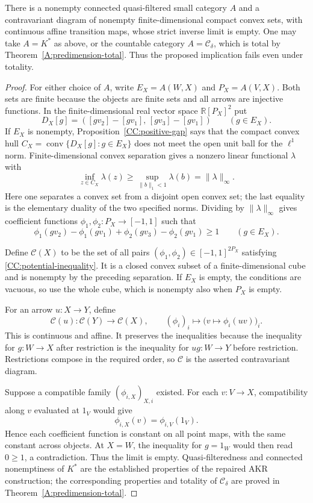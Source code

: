 \begin{theorem}
\label{CC:convex-counterexample}
There is a nonempty connected quasi-filtered small category $A$ and
a contravariant diagram of nonempty finite-dimensional compact convex
sets, with continuous affine transition maps, whose strict inverse
limit is empty. One may take $A=K^*$ as above, or the countable
category $A=\mathcal C_\delta$, which is total by
Theorem~\ref{A:predimension-total}. Thus the proposed implication
fails even under totality.
\end{theorem}
\begin{proof}
For either choice of $A$, write $E_X=A(W,X)$ and $P_X=A(V,X)$.
Both sets are finite because the objects are finite sets and all
arrows are injective functions. In the finite-dimensional real vector
space $\mathbb R[P_X]^2$ put
\[
 D_X[g]=([gv_2]-[gv_1],\,[gv_3]-[gv_1])
 \qquad(g\in E_X).
\]
If $E_X$ is nonempty, Proposition~\ref{CC:positive-gap} says that the
compact convex hull $C_X=\operatorname{conv}\{D_X[g]:g\in E_X\}$
does not meet the open unit ball for the $\ell^1$ norm.
Finite-dimensional convex separation gives a nonzero linear functional
$\lambda$ with
\[
 \inf_{z\in C_X}\lambda(z)
 \geq\sup_{\|b\|_1<1}\lambda(b)=\|\lambda\|_\infty.
\]
Here one separates a convex set from a disjoint open convex set; the
last equality is the elementary duality of the two specified norms.
Dividing by $\|\lambda\|_\infty$ gives coefficient functions
$\phi_1,\phi_2:P_X\to[-1,1]$ such that
\begin{equation}\label{CC:potential-inequality}
 \phi_1(gv_2)-\phi_1(gv_1)
 +\phi_2(gv_3)-\phi_2(gv_1)\geq1
 \qquad(g\in E_X).
\end{equation}

Define $\mathcal C(X)$ to be the set of all pairs
$(\phi_1,\phi_2)\in[-1,1]^{2P_X}$ satisfying
\eqref{CC:potential-inequality}. It is a closed convex subset of a
finite-dimensional cube and is nonempty by the preceding separation.
If $E_X$ is empty, the conditions are vacuous, so use the whole cube,
which is nonempty also when $P_X$ is empty.

For an arrow $u:X\to Y$, define
\[
 \mathcal C(u):\mathcal C(Y)\longrightarrow\mathcal C(X),
 \qquad(\phi_i)_i\longmapsto
 \bigl(v\longmapsto\phi_i(uv)\bigr)_i.
\]
This is continuous and affine. It preserves the inequalities because
the inequality for $g:W\to X$ after restriction is the inequality
for $ug:W\to Y$ before restriction. Restrictions compose in the
required order, so $\mathcal C$ is the asserted contravariant diagram.

Suppose a compatible family $(\phi_{i,X})_{X,i}$ existed. For each
$v:V\to X$, compatibility along $v$ evaluated at $1_V$ would give
\[
 \phi_{i,X}(v)=\phi_{i,V}(1_V).
\]
Hence each coefficient function is constant on all point maps, with
the same constant across objects. At $X=W$, the inequality for
$g=1_W$ would then read $0\geq1$, a contradiction. Thus the limit
is empty. Quasi-filteredness and connected nonemptiness of $K^*$ are
the established properties of the repaired AKR construction;
the corresponding properties and totality of $\mathcal C_\delta$
are proved in Theorem~\ref{A:predimension-total}.
\end{proof}

